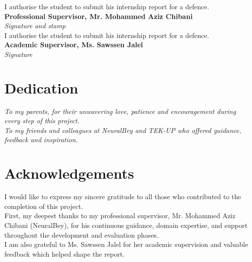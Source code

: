 \documentclass[12pt, a4paper, oneside]{report}
\begin{document}
\newpage
\thispagestyle{empty}
\vspace*{4cm}
\begin{center}
  \large
  I authorise the student to submit his internship report for a defence.\\[1.5cm]
  \textbf{Professional Supervisor, Mr. Mohammed Aziz Chibani}\\[0.4cm]
  \textit{Signature and stamp}\\[2cm]
  I authorise the student to submit his internship report for a defence.\\[1.5cm]
  \textbf{Academic Supervisor, Ms. Sawssen Jalel}\\[0.4cm]
  \textit{Signature}
\end{center}

\newpage
\thispagestyle{empty}
\chapter*{Dedication}


\vspace*{2cm}
\begin{center}
  \itshape
  To my parents, for their unwavering love, patience and encouragement during every step of this project.\\[1cm]
  To my friends and colleagues at NeuralBey and TEK-UP who offered guidance, feedback and inspiration.
\end{center}

\newpage
\chapter*{Acknowledgements}

I would like to express my sincere gratitude to all those who contributed to the completion of this project.\\

First, my deepest thanks to my professional supervisor, Mr. Mohammed Aziz Chibani (NeuralBey), for his continuous guidance, domain expertise, and support throughout the development and evaluation phases.\\

I am also grateful to Ms. Sawssen Jalel for her academic supervision and valuable feedback which helped shape the report.\\
\end{document}
